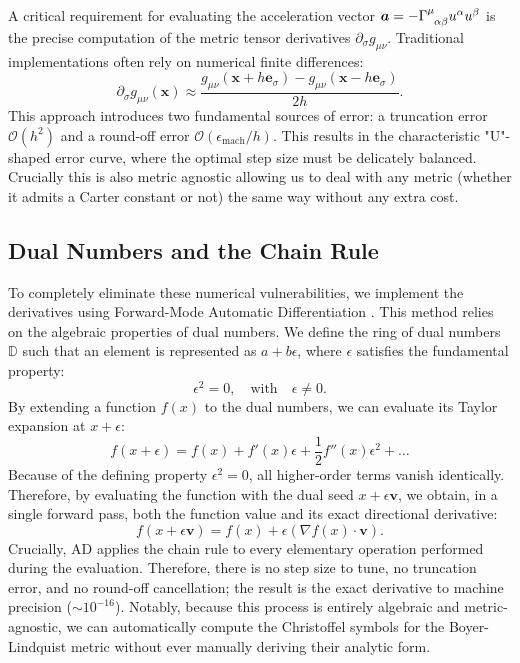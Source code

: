 \documentclass[11pt]{book}
\begin{document}
A critical requirement for evaluating the acceleration vector \(\bm{a} = -\tensor{\Gamma}{^\mu_\alpha_\beta} u^\alpha u^\beta\) is the precise computation of the metric tensor derivatives \(\partial_\sigma g_{\mu\nu}\). Traditional implementations often rely on numerical finite differences:
\begin{equation}
    \partial_\sigma g_{\mu\nu}(\bm{x}) \approx \frac{g_{\mu\nu}(\bm{x} + h \bm{e}_\sigma) - g_{\mu\nu}(\bm{x} - h \bm{e}_\sigma)}{2h}.
\end{equation}
This approach introduces two fundamental sources of error: a truncation error \(\mathcal{O}(h^2)\) and a round-off error \(\mathcal{O}(\epsilon_{\text{mach}} / h)\). This results in the characteristic "U"-shaped error curve, where the optimal step size must be delicately balanced. Crucially this is also metric agnostic allowing us to deal with any metric (whether it admits a Carter constant or not) the same way without any extra cost.

\subsection{Dual Numbers and the Chain Rule}
To completely eliminate these numerical vulnerabilities, we implement the derivatives using Forward-Mode Automatic Differentiation \cite{Griewank2008-dl, Wengert1964-sd}. This method relies on the algebraic properties of dual numbers. We define the ring of dual numbers \(\mathbb{D}\) such that an element is represented as \(a + b\epsilon\), where \(\epsilon\) satisfies the fundamental property:
\begin{equation}
    \epsilon^2 = 0, \quad \text{with} \quad \epsilon \neq 0.
\end{equation}
By extending a function \(f(x)\) to the dual numbers, we can evaluate its Taylor expansion at \(x + \epsilon\):
\begin{equation}
    f(x + \epsilon) = f(x) + f'(x)\epsilon + \frac{1}{2}f''(x)\epsilon^2 + \dots
\end{equation}
Because of the defining property \(\epsilon^2 = 0\), all higher-order terms vanish identically. Therefore, by evaluating the function with the dual seed \(x + \epsilon \bm{v}\), we obtain, in a single forward pass, both the function value and its exact directional derivative:
\begin{equation}
    f(x + \epsilon \bm{v}) = f(x) + \epsilon \left( \nabla f(x) \cdot \bm{v} \right).
\end{equation}
Crucially, AD applies the chain rule to every elementary operation performed during the evaluation. Therefore, there is no step size to tune, no truncation error, and no round-off cancellation; the result is the exact derivative to machine precision (\(\sim 10^{-16}\)). Notably, because this process is entirely algebraic and metric-agnostic, we can automatically compute the Christoffel symbols for the Boyer-Lindquist metric without ever manually deriving their analytic form.
\end{document}
